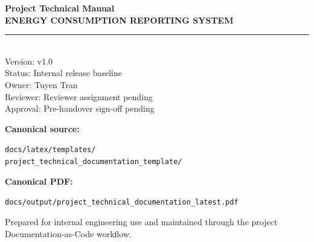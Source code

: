 \documentclass[12pt,oneside,openany]{book}
\numberwithin{equation}{chapter}
\newcommand{\ProjectName}{Energy Consumption Reporting System}
\newcommand{\DocumentShortTitle}{Project Technical Manual}
\newcommand{\DocumentVersionLabel}{v1.0}
\newcommand{\DocumentStatusLabel}{Internal release baseline}
\newcommand{\DocumentOwnerLabel}{Tuyen Tran}
\newcommand{\DocumentReviewerLabel}{Reviewer assignment pending}
\newcommand{\DocumentApprovalLabel}{Pre-handover sign-off pending}
\newcommand{\DocumentOutputPathDisplay}{\nolinkurl{docs/output/project_technical_documentation_latest.pdf}}
\begin{document}
	\printbibliography
	\let\cleardoublepage\clearpage
	\begin{titlepage}
		\thispagestyle{empty}
		\begin{center}
			\vspace*{3.8cm}
			{\fontsize{20}{24}\selectfont\bfseries\color{BrandDark} \DocumentShortTitle}\\[0.6cm]
			{\fontsize{24}{28}\selectfont\bfseries\MakeUppercase{\ProjectName}}\\[0.9cm]
			{\color{BrandBlue}\rule{0.72\textwidth}{1pt}}\\[0.9cm]
			{\fontsize{12}{15}\selectfont
				Version: \DocumentVersionLabel\\[5pt]
				Status: \DocumentStatusLabel\\[5pt]
				Owner: \DocumentOwnerLabel\\[5pt]
				Reviewer: \DocumentReviewerLabel\\[5pt]
				Approval: \DocumentApprovalLabel
			}
			\vfill
			{\fontsize{11}{13}\selectfont
				\textbf{Canonical source:}\\[2pt]
				{\raggedright\small \nolinkurl{docs/latex/templates/}\\\nolinkurl{project_technical_documentation_template/}\par}
				\vspace{6pt}
				\textbf{Canonical PDF:}\\[2pt]
				{\raggedright\small \DocumentOutputPathDisplay\par}
				\vspace{12pt}
				Prepared for internal engineering use and maintained through the project Documentation-as-Code workflow.
			}
		\end{center}
	\end{titlepage}
	
\end{document}
